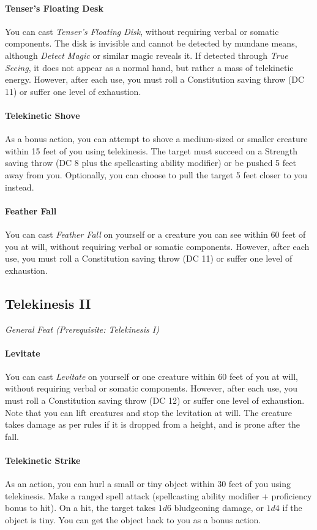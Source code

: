 \documentclass[twocolumn]{dndbook}
\begin{document}
\paragraph*{Tenser's Floating Desk} You can cast \emph{Tenser's Floating Disk},
without requiring verbal or somatic components.
The disk is invisible and cannot be detected by mundane means,
although \emph{Detect Magic} or similar magic reveals it.
If detected through \emph{True Seeing}, it does not appear as a normal hand, but rather a mass of telekinetic energy.
However, after each use, you must roll a Constitution saving throw (DC 11) or suffer one level of exhaustion.
\paragraph*{Telekinetic Shove} As a bonus action, you can attempt to shove a medium-sized or smaller creature within 15 feet of you
using telekinesis.
The target must succeed on a Strength saving throw (DC 8 plus the spellcasting ability modifier) or be pushed 5 feet away from you.
Optionally, you can choose to pull the target 5 feet closer to you instead.
\paragraph*{Feather Fall} You can cast \emph{Feather Fall} on yourself or a creature you can see within 60 feet of you at will,
without requiring verbal or somatic components. However, after each use, you must roll a Constitution saving throw (DC 11) or suffer one level of exhaustion.

\subsection{Telekinesis II}
{\emph{General Feat (Prerequisite: Telekinesis I)}}\par
\paragraph*{Levitate} You can cast \emph{Levitate} on yourself or one creature within 60 feet of you at will,
without requiring verbal or somatic components. However, after each use, you must roll a Constitution saving throw (DC 12) or suffer one level of exhaustion.
Note that you can lift creatures and stop the levitation at will.
The creature takes damage as per rules if it is dropped from a height, and is prone after the fall.
\paragraph*{Telekinetic Strike} As an action, you can hurl a small or tiny object within 30 feet of you
using telekinesis. Make a ranged spell attack (spellcasting ability modifier + proficiency bonus to hit).
On a hit, the target takes $ 1d6 $ bludgeoning damage, or $ 1d4 $ if the object is tiny.
You can get the object back to you as a bonus action.
\end{document}
